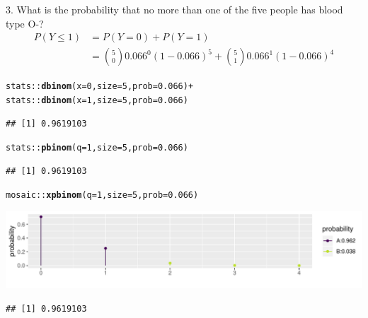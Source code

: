 \documentclass[handout]{beamer}\usepackage[]{graphicx}\usepackage[]{color}
\newcommand{\hlnum}[1]{\textcolor[rgb]{0.686,0.059,0.569}{#1}}%
\newcommand{\hlopt}[1]{\textcolor[rgb]{0,0,0}{#1}}%
\newcommand{\hlstd}[1]{\textcolor[rgb]{0.345,0.345,0.345}{#1}}%
\newcommand{\hlkwc}[1]{\textcolor[rgb]{0.333,0.667,0.333}{#1}}%
\newcommand{\hlkwd}[1]{\textcolor[rgb]{0.737,0.353,0.396}{\textbf{#1}}}%
\newenvironment{knitrout}{}{} %
\begin{document}
\begin{frame}[fragile]{3. What is the probability that no more than one of the five people has blood type O-?}
\footnotesize
\begin{align*}
P(Y \leq 1) & = P(Y = 0) + P(Y = 1) \\
& = \binom{5}{0} 0.066^0 (1- 0.066)^5 + \binom{5}{1} 0.066^1 (1- 0.066)^4
\end{align*}


\begin{knitrout}\scriptsize
{}\color{fgcolor}
\begin{alltt}
\hlstd{stats}\hlopt{::}\hlkwd{dbinom}\hlstd{(}\hlkwc{x} \hlstd{=} \hlnum{0}\hlstd{,} \hlkwc{size} \hlstd{=} \hlnum{5}\hlstd{,} \hlkwc{prob} \hlstd{=} \hlnum{0.066}\hlstd{)} \hlopt{+}
        \hlstd{stats}\hlopt{::}\hlkwd{dbinom}\hlstd{(}\hlkwc{x} \hlstd{=} \hlnum{1}\hlstd{,} \hlkwc{size} \hlstd{=} \hlnum{5}\hlstd{,} \hlkwc{prob} \hlstd{=} \hlnum{0.066}\hlstd{)}
\end{alltt}
\begin{verbatim}
## [1] 0.9619103
\end{verbatim}
\begin{alltt}
\hlstd{stats}\hlopt{::}\hlkwd{pbinom}\hlstd{(}\hlkwc{q} \hlstd{=} \hlnum{1}\hlstd{,} \hlkwc{size} \hlstd{=} \hlnum{5}\hlstd{,} \hlkwc{prob} \hlstd{=} \hlnum{0.066}\hlstd{)}
\end{alltt}
\begin{verbatim}
## [1] 0.9619103
\end{verbatim}
\begin{alltt}
\hlstd{mosaic}\hlopt{::}\hlkwd{xpbinom}\hlstd{(}\hlkwc{q} \hlstd{=} \hlnum{1}\hlstd{,} \hlkwc{size} \hlstd{=} \hlnum{5}\hlstd{,} \hlkwc{prob} \hlstd{=} \hlnum{0.066}\hlstd{)}
\end{alltt}


{\centering \includegraphics[width=1\linewidth]{figure/unnamed-chunk-10-1} 

}


\begin{verbatim}
## [1] 0.9619103
\end{verbatim}

\end{knitrout}

\end{frame}
\end{document}
